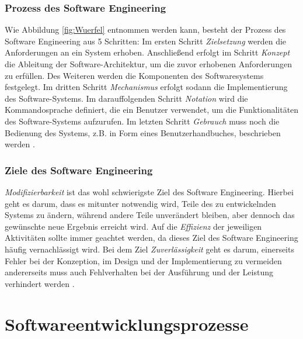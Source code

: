  \subsubsection{Prozess des Software Engineering}

Wie Abbildung  \ref{fig:Wuerfel} entnommen werden kann, besteht der Prozess des Software Engineering aus 5 Schritten: Im ersten Schritt \textit{Zielsetzung} werden die Anforderungen an ein System erhoben. Anschließend erfolgt im Schritt \textit{Konzept} die Ableitung der Software-Architektur, um die zuvor erhobenen Anforderungen zu erfüllen. Des Weiteren werden die Komponenten des Softwaresystems festgelegt. Im dritten Schritt \textit {Mechanismus} erfolgt sodann die Implementierung des Software-Systems. Im darauffolgenden Schritt \textit{Notation} wird die Kommandosprache definiert, die ein Benutzer verwendet, um die Funktionalitäten des Software-Systems aufzurufen. Im letzten Schritt \textit{Gebrauch} muss noch die Bedienung des Systems, z.B. in Form eines Benutzerhandbuches, beschrieben werden \cite{ross1975software}.

  \subsubsection{Ziele des Software Engineering}

\textit{Modifizierbarkeit} ist das wohl schwierigste Ziel des Software Engineering. Hierbei geht es darum, dass es mitunter notwendig wird, Teile des zu entwickelnden Systems zu ändern, während andere Teile unverändert bleiben, aber dennoch das gewünschte neue Ergebnis erreicht wird. Auf die \textit{Effizienz} der jeweiligen Aktivitäten sollte immer geachtet werden, da dieses Ziel des Software Engineering häufig vernachlässigt wird. Bei dem Ziel \textit{Zuverlässigkeit} geht es darum, einerseits Fehler bei der Konzeption, im Design und der Implementierung zu vermeiden andererseits muss auch Fehlverhalten bei der Ausführung und der Leistung verhindert werden \cite{ross1975software}.
 
\section{Softwareentwicklungsprozesse}\label{sec:chapter.2: Softwareentwicklungsprozesse}

